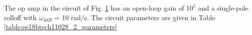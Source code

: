 The op amp in the circuit of Fig. \ref{fig:ee18btech11028_2_q} has an open-loop gain of $10^{5}$ and a single-pole rolloff with $\omega_{3dB}$ = 10 rad/s.  The circuit parameters are given in Table     \ref{table:ee18btech11028_2_parameters}

\begin{figure}[!ht]
	\begin{center}
		\resizebox{\columnwidth}{!}{}
	\end{center}
\caption{}
\label{fig:ee18btech11028_2_q}
\end{figure}
%
\begin{table}[!ht]
    \centering
    
    \caption{}
    \label{table:ee18btech11028_2_parameters}
\end{table}

